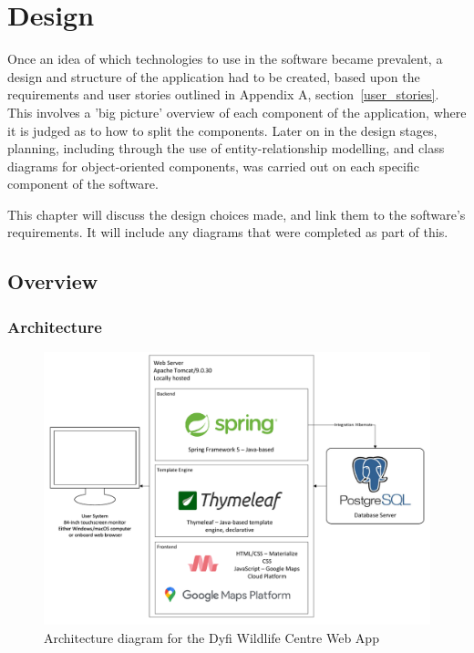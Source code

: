 \chapter{Design}

Once an idea of which technologies to use in the software became prevalent, a design and structure of the application had to be created, based upon the requirements and user stories outlined in Appendix A, section~\ref{user_stories}. This involves a 'big picture' overview of each component of the application, where it is judged as to how to split the components. Later on in the design stages, planning, including through the use of entity-relationship modelling, and class diagrams for object-oriented components, was carried out on each specific component of the software.

This chapter will discuss the design choices made, and link them to the software's requirements. It will include any diagrams that were completed as part of this.
\newpage
\section{Overview}

\subsection{Architecture}
\begin{figure}[H]
	\includegraphics[scale=0.7]{diagrams/architecture_diagram}
	\caption{Architecture diagram for the Dyfi Wildlife Centre Web App}
\end{figure}	

